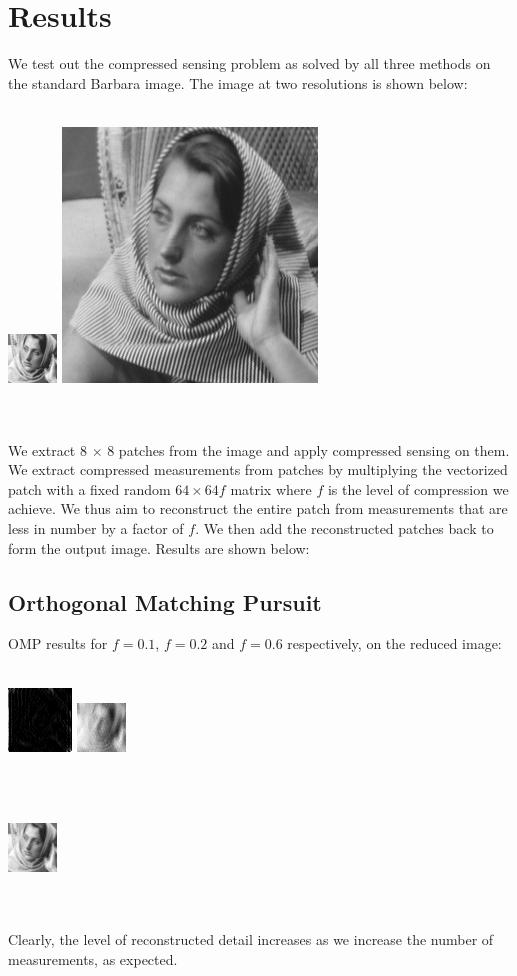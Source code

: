 \documentclass[letterpaper, 10 pt, conference]{article}
\begin{document}
\section{Results}
We test out the compressed sensing problem as solved by all three methods on the standard Barbara image. The image at two resolutions is shown below: \\ \\
\centerline{\includegraphics[scale=2.6]{barbara} \includegraphics[scale=0.5]{barbara256}} \\ \\ 
We extract 8 $\times$ 8 patches from the image and apply compressed sensing on them. We extract compressed measurements from patches by multiplying the vectorized patch with a fixed random $64 \times 64f$ matrix where $f$ is the level of compression we achieve. We thus aim to reconstruct the entire patch from measurements that are less in number by a factor of $f$. We then add the reconstructed patches back to form the output image. Results are shown below:

\subsection{Orthogonal Matching Pursuit}
OMP results for $f=0.1$, $f=0.2$ and $f=0.6$ respectively, on the reduced image: \\ \\
\centerline{\includegraphics[scale=2]{out-omp-10p} \includegraphics[scale=2.6]{out-omp-20p}} \\ \\
\centerline{ \includegraphics[scale=2.6]{out-omp-60p}} \\ \\
Clearly, the level of reconstructed detail increases as we increase the number of measurements, as expected. 
\end{document}
